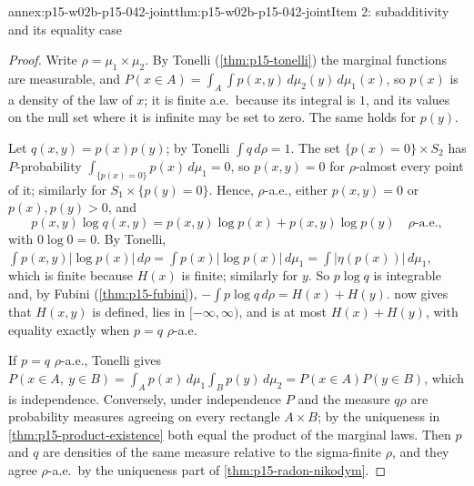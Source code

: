 \begin{annexitem}{annex:p15-w02b-p15-042-joint}{thm:p15-w02b-p15-042-joint}{Item 2: subadditivity and its equality case}
\begin{proof}
Write \(\rho=\mu_1\times\mu_2\). By Tonelli (\cref{thm:p15-tonelli}) the
marginal functions are measurable, and
\(P(x\in A)=\int_A\int p(x,y)\,d\mu_2(y)\,d\mu_1(x)\), so \(p(x)\) is a
density of the law of \(x\); it is finite a.e.\ because its integral is
\(1\), and its values on the null set where it is infinite may be set to
zero. The same holds for \(p(y)\).

Let \(q(x,y)=p(x)p(y)\); by Tonelli \(\int q\,d\rho=1\). The set
\(\{p(x)=0\}\times S_2\) has \(P\)-probability
\(\int_{\{p(x)=0\}}p(x)\,d\mu_1=0\), so \(p(x,y)=0\) for \(\rho\)-almost every
point of it; similarly for \(S_1\times\{p(y)=0\}\). Hence, \(\rho\)-a.e.,
either \(p(x,y)=0\) or \(p(x),p(y)>0\), and
\[
 p(x,y)\log q(x,y)=p(x,y)\log p(x)+p(x,y)\log p(y)\quad\rho\text{-a.e.},
\]
with \(0\log0=0\). By Tonelli,
\(\int p(x,y)|\log p(x)|\,d\rho=\int p(x)|\log p(x)|\,d\mu_1=\int|\eta(p(x))|\,d\mu_1\),
which is finite because \(H(x)\) is finite; similarly for \(y\). So
\(p\log q\) is integrable and, by Fubini (\cref{thm:p15-fubini}),
\(-\int p\log q\,d\rho=H(x)+H(y)\).
 now gives that \(H(x,y)\) is defined, lies in
\([-\infty,\infty)\), and is at most \(H(x)+H(y)\), with equality exactly when
\(p=q\) \(\rho\)-a.e.

If \(p=q\) \(\rho\)-a.e., Tonelli gives
\(P(x\in A,\ y\in B)=\int_Ap(x)\,d\mu_1\int_Bp(y)\,d\mu_2
 =P(x\in A)P(y\in B)\), which is independence. Conversely, under independence
\(P\) and the measure \(q\rho\) are probability measures agreeing on every
rectangle \(A\times B\); by the uniqueness in
\cref{thm:p15-product-existence} both equal the product of the marginal
laws. Then \(p\) and \(q\) are densities of the same measure relative to the
sigma-finite \(\rho\), and they agree \(\rho\)-a.e.\ by the uniqueness part of
\cref{thm:p15-radon-nikodym}.
\end{proof}
\end{annexitem}

